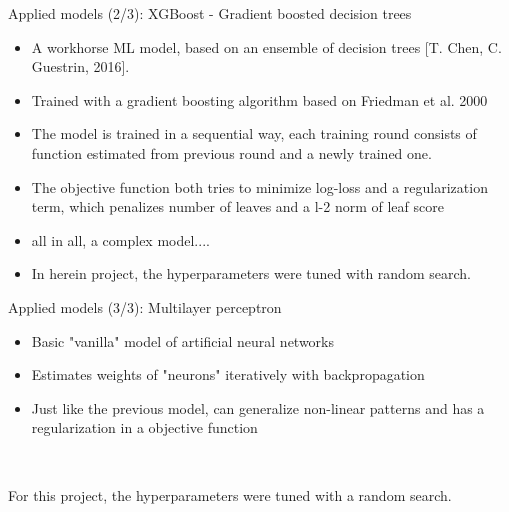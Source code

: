 \documentclass{beamer}
\begin{document}
\begin{frame}{Applied models (2/3): XGBoost - Gradient boosted decision trees}

\begin{itemize}
\item A workhorse ML model, based on an ensemble of decision trees [T. Chen, C. Guestrin, 2016].
\item Trained with a gradient boosting algorithm based on Friedman et al. 2000
\item The model is trained in a sequential way, each training round consists of function estimated from previous round and a newly trained one.
\item The objective function both tries to minimize log-loss and a regularization term, which penalizes number of leaves and a l-2 norm of leaf score
\item all in all, a complex model....

\item In herein project, the hyperparameters were tuned with random search.

\end{itemize}

\end{frame}

\begin{frame}{Applied models (3/3): Multilayer perceptron}

\begin{itemize}
\item Basic "vanilla" model of artificial neural networks
\item Estimates weights of "neurons" iteratively with backpropagation
\item Just like the previous model, can generalize non-linear patterns and has a regularization in a objective function
\end{itemize}

\

For this project, the hyperparameters were tuned with a random search.

\end{frame}
\end{document}
